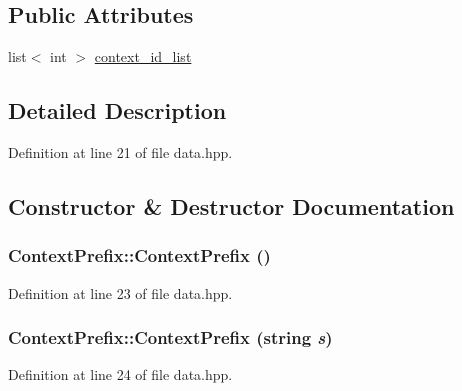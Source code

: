 \subsection*{Public Attributes}
\begin{DoxyCompactItemize}
\item 
list$<$ int $>$ \hyperlink{struct_context_prefix_a50c0426af5b66766ab87aae8f77a0a31}{context\_\-id\_\-list}
\end{DoxyCompactItemize}


\subsection{Detailed Description}


Definition at line 21 of file data.hpp.

\subsection{Constructor \& Destructor Documentation}
\hypertarget{struct_context_prefix_a379b1aff6ff34fbed86a70a091434d19}{
\subsubsection[{ContextPrefix}]{\setlength{\rightskip}{0pt plus 5cm}ContextPrefix::ContextPrefix ()}}
\label{struct_context_prefix_a379b1aff6ff34fbed86a70a091434d19}


Definition at line 23 of file data.hpp.\hypertarget{struct_context_prefix_a967de73f3ce083123324c5a03e69d5c8}{
\subsubsection[{ContextPrefix}]{\setlength{\rightskip}{0pt plus 5cm}ContextPrefix::ContextPrefix (string {\em s})}}
\label{struct_context_prefix_a967de73f3ce083123324c5a03e69d5c8}


Definition at line 24 of file data.hpp.

